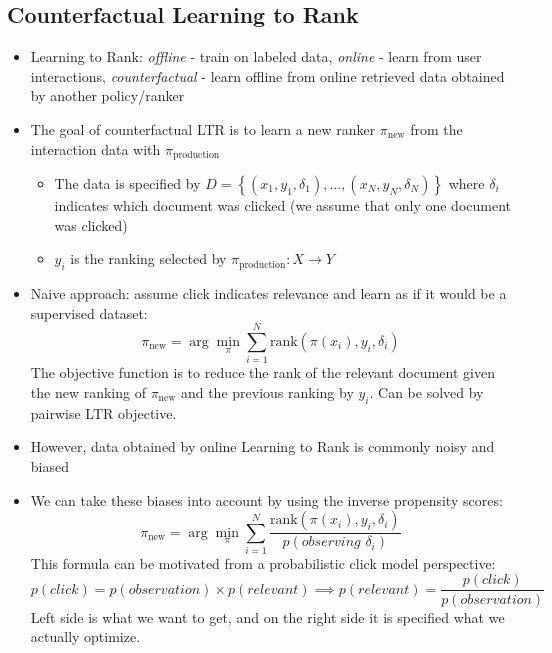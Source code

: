 \subsection{Counterfactual Learning to Rank}
\begin{itemize}
	\item Learning to Rank: \textit{offline} - train on labeled data, \textit{online} - learn from user interactions, \textit{counterfactual} - learn offline from online retrieved data obtained by another policy/ranker
	\item The goal of counterfactual LTR is to learn a new ranker $\pi_{\text{new}}$ from the interaction data with $\pi_{\text{production}}$
	\begin{itemize}
		\item The data is specified by $D=\left\{(x_1,y_1,\delta_1),...,(x_N,y_N,\delta_N)\right\}$ where $\delta_i$ indicates which document was clicked (we assume that only one document was clicked)
		\item $y_i$ is the ranking selected by $\pi_{\text{production}}:X\to Y$
	\end{itemize}
	\item Naive approach: assume click indicates relevance and learn as if it would be a supervised dataset: $$\pi_{\text{new}} = \arg\min_{\pi} \sum\limits_{i=1}^{N} \text{rank}\left(\pi(x_i),y_i,\delta_i\right)$$
	The objective function is to reduce the rank of the relevant document given the new ranking of $\pi_{\text{new}}$ and the previous ranking by $y_i$. Can be solved by pairwise LTR objective.
	\item However, data obtained by online Learning to Rank is commonly noisy and biased
	\item We can take these biases into account by using the inverse propensity scores:
	$$\pi_{\text{new}} = \arg\min_{\pi} \sum\limits_{i=1}^{N} \frac{\text{rank}\left(\pi(x_i),y_i,\delta_i\right)}{p(\textit{observing }\delta_i)}$$
	This formula can be motivated from a probabilistic click model perspective:
	$$p(\textit{click}) = p(\textit{observation})\times p(\textit{relevant}) \implies p(\textit{relevant}) = \frac{p(\textit{click})}{p(\textit{observation})}$$
	Left side is what we want to get, and on the right side it is specified what we actually optimize.
\end{itemize}
